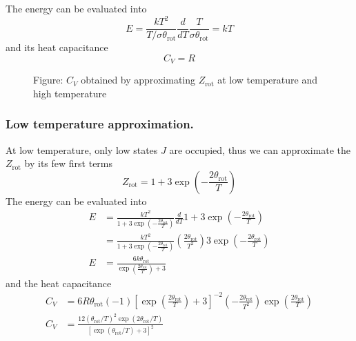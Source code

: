 \documentclass[../../../Main.tex]{subfiles}
\begin{document}
The energy can be evaluated into
\begin{equation*}
	E=\frac{kT^2}{T/\sigma\theta_\text{rot}}\frac{d}{dT}\frac{T}{\sigma\theta_\text{rot}}=kT
\end{equation*}
and its heat capacitance
\begin{equation*}
	C_V=R
\end{equation*}

\begin{figure*}
	\centering
	\caption*{Figure: $C_V$ obtained by approximating $Z_\text{rot}$ at low temperature and high temperature}
\end{figure*}

\subsubsection*{Low temperature approximation.} At low temperature, only low states $J$ are occupied, thus we can approximate the $Z_\text{rot}$ by its few first terms
\begin{equation*}
	Z_\text{rot}=1+3\exp\left(-\frac{2\theta_\text{rot}}{T}\right)
\end{equation*}
The energy can be evaluated into
\begin{align*}
	E & =\frac{kT^2}{1+3\exp\left(-\frac{2\theta_\text{rot}}{T}\right)}\frac{d}{dT}1+3\exp\left(-\frac{2\theta_\text{rot}}{T}\right)                              \\
	  & =\frac{kT^2}{1+3\exp\left(-\frac{2\theta_\text{rot}}{T}\right)}\left(\frac{2\theta_\text{rot}}{T^2}\right)3\exp\left(-\frac{2\theta_\text{rot}}{T}\right) \\
	E & =\frac{6k\theta_\text{rot}}{\exp\left(\frac{2\theta_\text{rot}}{T}\right)+3}
\end{align*}
and the heat capacitance
\begin{align*}
	C_V & =6R\theta_\text{rot}(-1)\left[\exp\left(\frac{2\theta_\text{rot}}{T}\right)+3\right]^{-2}\left(-\frac{2\theta_\text{rot}}{T^2}\right)\exp\left(\frac{2\theta_\text{rot}}{T}\right) \\
	C_V & =\frac{12(\theta_\text{rot}/T)^2\exp(2\theta_\text{rot}/T)}{\left[\exp(\theta_\text{rot}/T)+3\right]^2}
\end{align*}
\end{document}
